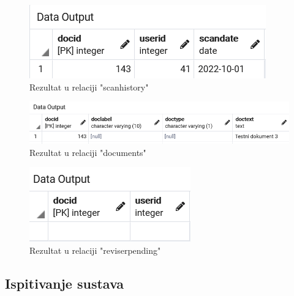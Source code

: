 \begin{figure}[H]
	\centering
	\includegraphics[scale=0.5]{./slike/baza8sh.png}
	\caption{Rezultat u relaciji "scanhistory"}
	\label{fig:BAZA8a}
\end{figure}
\begin{figure}[H]
	\centering
	\includegraphics[scale=0.5]{./slike/baza8doc.png}
	\caption{Rezultat u relaciji "documents"}
	\label{fig:BAZA8b}
\end{figure}
\begin{figure}[H]
	\centering
	\includegraphics[scale=0.5]{./slike/baza8rp.png}
	\caption{Rezultat u relaciji "reviserpending"}
	\label{fig:BAZA8c}
\end{figure}
			
		
			
			\subsection{Ispitivanje sustava}
